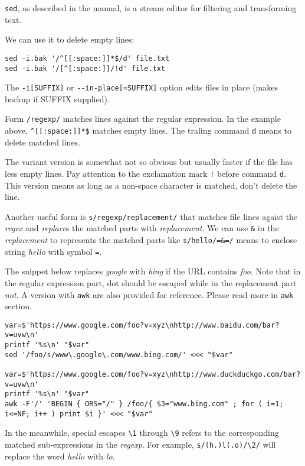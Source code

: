 \lstinline|sed|, as described in the manual, is a stream editor
for filtering and transforming text.

We can use it to delete empty lines:

\begin{lstlisting}
sed -i.bak '/^[[:space:]]*$/d' file.txt
sed -i.bak '/[^[:space:]]/!d' file.txt
\end{lstlisting}

The \lstinline|-i[SUFFIX]| or \lstinline|--in-place[=SUFFIX]|
option edits files in place (makes backup if SUFFIX supplied).

Form \lstinline|/regexp/| matches lines against the regular
expression. In the example above, \lstinline|^[[:space:]]*$|
matches empty lines. The traling command \lstinline|d| means to
delete matched lines.

The variant version is somewhat not so obvious but usually faster
if the file has less empty lines. Pay attention to the exclamation
mark \lstinline|!| before command \lstinline|d|. This version
means as long as a non-space character is matched, don't delete
the line.

Another useful form is \lstinline|s/regexp/replacement/| that
matches file lines agaist the \textit{regex} and \textit{replace}s
the matched parts with \textit{replacement}. We can use
\lstinline|&| in the \textit{replacement} to represents the
matched parts like \lstinline|s/hello/=&=/| means to enclose
string \textit{hello} with symbol \verb|=|.

The snippet below replaces \textit{google} with \textit{bing} if
the URL contains \textit{foo}. Note that in the regular expression
part, dot should be escaped while in the replacement part
\textit{not}. A version with \lstinline|awk| are also provided for
reference. Please read more in \verb|awk| section.

\begin{minipage}{1.0\linewidth}
\begin{lstlisting}
var=$'https://www.google.com/foo?v=xyz\nhttp://www.baidu.com/bar?v=uvw\n'
printf '%s\n' "$var"
sed '/foo/s/www\.google\.com/www.bing.com/' <<< "$var"

var=$'https://www.google.com/foo?v=xyz\nhttp://www.duckduckgo.com/bar?v=uvw\n'
printf '%s\n' "$var"
awk -F'/' 'BEGIN { ORS="/" } /foo/{ $3="www.bing.com" ; for ( i=1; i<=NF; i++ ) print $i }' <<< "$var"
\end{lstlisting}
\end{minipage}

In the meanwhile, special escapes \lstinline|\1| through
\lstinline|\9| refers to the corresponding matched sub-expressions
in the \textit{regexp}. For example, \lstinline|s/(h.)l(.o)/\2/|
will replace the word \textit{hello} with \textit{lo}.

